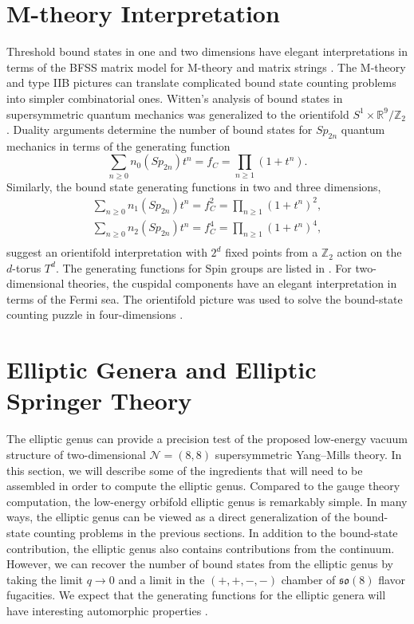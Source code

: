 \documentclass[12pt]{article}
\numberwithin{equation}{section}%
\theoremstyle{definition}
\newcommand{\cN}{\mathcal{N}}
\newcommand{\R}{\mathbb{R}}
\newcommand{\bZ}{\mathbb{Z}}
\newcommand{\fso}{\mathfrak{so}}
\begin{document}
\section{M-theory Interpretation}
\label{sec:mtheory}
Threshold bound states in one and two dimensions have elegant interpretations in terms of the BFSS matrix model for M-theory \cite{Banks:1996vh} and matrix strings \cite{Dijkgraaf:1997vv, Dijkgraaf:1997ku}.  The M-theory and type IIB pictures can translate complicated bound state counting problems into simpler combinatorial ones.  Witten's analysis of bound states in supersymmetric quantum mechanics was generalized to the orientifold $S^1 \times \R^9/\mathbb{Z}_2$ \cite{Hanany:1999jy, Lee:2017lfw}.  Duality arguments determine the number of bound states for $Sp_{2n}$ quantum mechanics in terms of the generating function
\begin{equation*}
\sum_{n \ge 0} n_0(Sp_{2n}) t^n = f_{C} = \prod_{n \ge 1} (1 + t^n).
\end{equation*}
Similarly, the bound state generating functions in two and three dimensions,
\begin{align*}
\sum_{n \ge 0} n_1(Sp_{2n}) t^n = f^2_{C} = \prod_{n \ge 1} (1 + t^n)^2, \\
\sum_{n \ge 0} n_2(Sp_{2n}) t^n = f^4_{C} = \prod_{n \ge 1} (1 + t^n)^4, \\
\end{align*}
suggest an orientifold interpretation with $2^d$ fixed points from a $\bZ_2$ action on the $d$-torus $T^d.$
The generating functions for Spin groups are listed in \cite{jakob2024countingabsolutelyindecomposablegbundles}.
For two-dimensional theories, the cuspidal components have an elegant interpretation in terms of the Fermi sea.  The orientifold picture was used to solve the bound-state counting puzzle in four-dimensions \cite{Witten:1997bs}.


\section{Elliptic Genera and Elliptic Springer Theory}
\label{sec:elliptic}
The elliptic genus can provide a precision test of the proposed low-energy vacuum structure of two-dimensional $\cN = (8,8)$ supersymmetric Yang--Mills theory.  In this section, we will describe some of the ingredients that will need to be assembled in order to compute the elliptic genus.  Compared to the gauge theory computation, the low-energy orbifold elliptic genus is remarkably simple.  In many ways, the elliptic genus can be viewed as a direct generalization of the bound-state counting problems in the previous sections.  In addition to the bound-state contribution, the elliptic genus also contains contributions from the continuum.  However, we can recover the number of bound states from the elliptic genus by taking the limit $q \rightarrow 0$ and a limit in the $(+, +, -, -)$ chamber of $\fso(8)$ flavor fugacities.  We expect that the generating functions for the elliptic genera will have interesting automorphic properties \cite{Kac:1999av}.
\end{document}
